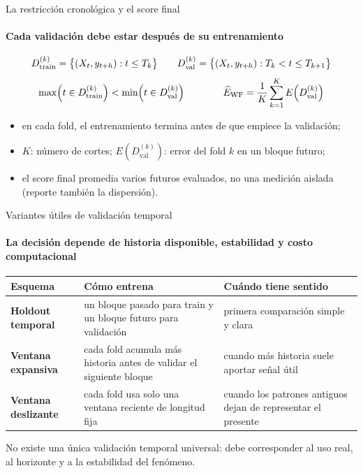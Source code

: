 \documentclass[aspectratio=169,11pt]{beamer}  %
\newcommand{\hrow}{\rowcolor{mlcream}}
\begin{document}
\begin{frame}{La restricción cronológica y el score final}
\framesubtitle{Cada validación debe estar después de su entrenamiento}
\begin{gather*}
D^{(k)}_{\mathrm{train}} = \bigl\{(X_t, y_{t+h}) : t \le T_k\bigr\} \qquad D^{(k)}_{\mathrm{val}} = \bigl\{(X_t, y_{t+h}) : T_k < t \le T_{k+1}\bigr\}\\[0.4em]
\max\Bigl(t \in D^{(k)}_{\mathrm{train}}\Bigr) < \min\Bigl(t \in D^{(k)}_{\mathrm{val}}\Bigr)
\qquad\qquad
\widehat{E}_{\mathrm{WF}} = \frac{1}{K}\sum_{k=1}^{K} E\Bigl(D^{(k)}_{\mathrm{val}}\Bigr)
\end{gather*}
\begin{itemize}\small
\item en cada fold, el entrenamiento termina antes de que empiece la validación;
\item $K$: número de cortes; $E(D^{(k)}_{\mathrm{val}})$: error del fold $k$ en un bloque futuro;
\item el score final promedia varios futuros evaluados, no una medición aislada (reporte también la dispersión).
\end{itemize}
\end{frame}

\begin{frame}{Variantes útiles de validación temporal}
\framesubtitle{La decisión depende de historia disponible, estabilidad y costo computacional}
\centering
\begin{tabular}{@{}l P{0.33\textwidth} P{0.33\textwidth}@{}}
\toprule
\hrow \textbf{Esquema} & Cómo entrena & Cuándo tiene sentido\\
\midrule
\textbf{Holdout temporal} & un bloque pasado para train y un bloque futuro para validación & primera comparación simple y clara\\
\textbf{Ventana expansiva} & cada fold acumula más historia antes de validar el siguiente bloque & cuando más historia suele aportar señal útil\\
\textbf{Ventana deslizante} & cada fold usa solo una ventana reciente de longitud fija & cuando los patrones antiguos dejan de representar el presente\\
\bottomrule
\end{tabular}

\vspace{0.4em}
No existe una única validación temporal universal: debe corresponder al uso real, al horizonte y a la estabilidad del fenómeno.
\end{frame}
\end{document}
